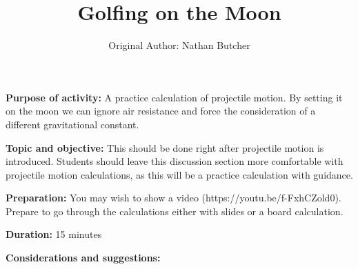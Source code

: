 \documentclass{article}
\title{Golfing on the Moon}
\author{Original Author: Nathan Butcher}
\date{}
\begin{document}
\maketitle
\thispagestyle{empty}

\textbf{Purpose of activity:} A practice calculation of projectile motion. By setting it on the moon we can ignore air resistance and force the consideration of a different gravitational constant.

\textbf{Topic and objective:} This should be done right after projectile motion is introduced. Students should leave this discussion section more comfortable with projectile motion calculations, as this will be a practice calculation with guidance. 

\textbf{Preparation:} You may wish to show a video (https://youtu.be/f-FxhCZold0). Prepare to go through the calculations either with slides or a board calculation.

\textbf{Duration:} 15 minutes

\textbf{Considerations and suggestions:}

\hspace{14pt}
\end{document}
